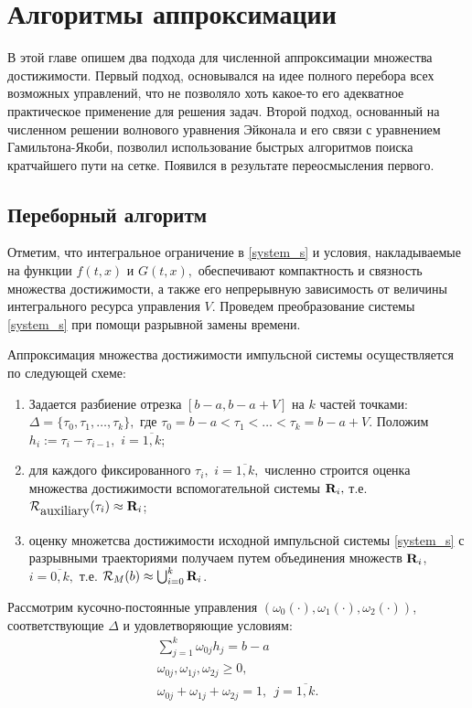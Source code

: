 \section{Алгоритмы аппроксимации}
\label{sec:algrhtms}


В этой главе опишем два подхода для численной аппроксимации множества
достижимости. Первый подход, основывался на идее полного перебора всех
возможных управлений, что не позволяло хоть какое-то его адекватное
практическое применение для решения задач.  Второй подход, основанный
на численном решении волнового уравнения Эйконала и его связи с
уравнением Гамильтона-Якоби, позволил использование быстрых алгоритмов
поиска кратчайшего пути на сетке. Появился в результате переосмысления
первого.

\subsection{Переборный алгоритм}
\label{sec:simple_alg}

Отметим, что интегральное ограничение в
\eqref{system_s} и условия, накладываемые на функции $f(t,x)$ и $G(t,x),$
обеспечивают компактность и связность множества достижимости, а
также его непрерывную зависимость от величины интегрального
ресурса управления $V$. Проведем преобразование системы
\eqref{system_s} при помощи разрывной замены времени. 

Аппроксимация множества достижимости импульсной системы осуществляется по
следующей схеме:
\begin{enumerate}
\item Задается разбиение отрезка $[b-a,b-a+V]$ на $k$ частей точками:
  $ \Delta=\big\{ \tau_{0}, \tau_{1}, \ldots, \tau_{k} \big\}, $ где
  $\tau_{0}=b-a< \tau_{1}< \ldots < \tau_{k}=b-a+V$. Положим
  $h_i:=\tau_{i}-\tau_{i-1},$ $i=\overline{1,k}$;
\item для каждого фиксированного $\tau_{i},$ $i=\overline{1,k},$
  численно строится оценка множества достижимости вспомогательной
  системы $\mbox{\bf R}_i ,$ т.е.
  ${\mathcal R}_{\mbox{\rm auxiliary}}(\tau_{i}) \approx \mbox{\bf
    R}_i$;
\item оценку множетсва достижимости исходной импульсной системы \eqref{system_s} с
  разрывными траекториями получаем путем объединения множеств
  $\mbox{\bf R}_i$, $i=\overline{0,k},$ т.е.
  $ {\mathcal R}_M(b)\approx \bigcup_{i=0}^k \mbox{\bf R}_i$.
\end{enumerate}


Рассмотрим кусочно-постоянные управления
$(\omega_0(\cdot),\omega_1(\cdot),\omega_2(\cdot))$, соответствующие
$\Delta$ и удовлетворяющие условиям:
\begin{equation*}
  \begin{array}{l}
    \sum_{j=1}^k \omega_{0j}h_j=b-a\\
    \omega_{0j}, \omega_{1j}, \omega_{2j} \geq 0,\\ 
    \omega_{0j}+ \omega_{1j}+ \omega_{2j} =1, \ \ j=\overline{1,k}.
  \end{array}
\end{equation*}

